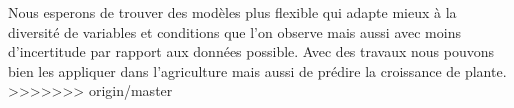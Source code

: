 Nous esperons de trouver des mod\`eles plus flexible qui adapte mieux \`a la diversit\'e de variables et conditions que l'on observe mais aussi avec moins d'incertitude par rapport aux donn\'ees possible. Avec des travaux nous pouvons bien les appliquer dans l'agriculture mais aussi de pr\'edire la croissance de plante.
>>>>>>> origin/master
